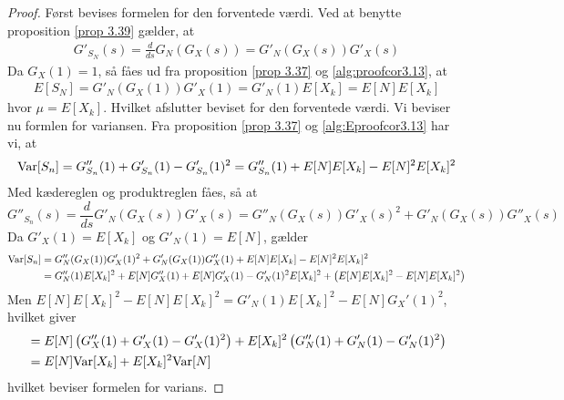 \begin{proof}
Først bevises formelen for den forventede værdi. Ved at benytte  proposition \ref{prop 3.39} gælder, at
\begin{align} \label{alg:proofcor3.13}
    G'_{S_N}(s) = \frac{d}{ds}G_N(G_X(s))=G'_N(G_X(s))G'_X(s)
\end{align}
Da $G_X(1)=1$, så fåes ud fra proposition \ref{prop 3.37} og \eqref{alg:proofcor3.13}, at
\begin{align} \label{alg:Eproofcor3.13}
    E[S_N]= G'_N(G_X(1))G'_X(1)=G'_N(1)E[X_k]=E[N]E[X_k]
\end{align}
hvor $\mu=E[X_k]$. Hvilket afslutter beviset for den forventede værdi. Vi beviser nu formlen for variansen. Fra proposition \ref{prop 3.37} og \eqref{alg:Eproofcor3.13} har vi, at 
\begin{equation*}
    \textnormal{Var}[S_n] = G''_{S_n}(1) + G'_{S_n}(1) - G'_{S_n}(1)^2 = G''_{S_n}(1) + E[N]E[X_k] - E[N]^2E[X_k]^2
\end{equation*}
Med kædereglen og produktreglen fåes, så at
\begin{equation*}
    G''_{S_n}(s) = \frac{d}{ds} G'_N(G_X(s))G'_X(s) = G''_N(G_X(s))G'_X(s)^2 + G'_N(G_X(s))G''_X(s)
\end{equation*}
Da $G'_X(1)=E[X_k]$ og $G'_N(1)=E[N]$, gælder
\begin{align*}
    \textnormal{Var}[S_n]&= 
     G''_N(G_X(1))G'_X(1)^2 + G'_N(G_X(1))G''_X(1)
    + E[N]E[X_k] - E[N]^2E[X_k]^2
    \\
    &= G''_N(1)E[X_k]^2 + E[N] G''_X(1) + E[N]G'_X(1) - G'_N(1)^2E[X_k]^2 + \left(E[N]E[X_k]^2 - E[N]E[X_k]^2\right)
\end{align*}
Men $E[N]E[X_k]^2 - E[N]E[X_k]^2 = G'_N(1)E[X_k]^2 - E[N]G_X'(1)^2$, hvilket giver
\begin{align*}
    &= E[N]\left(G''_X(1) + G'_X(1) - G'_X(1)^2 \right) + E[X_k]^2\left(G''_N(1) + G'_N(1) - G'_N(1)^2\right)
    \\
    &= E[N]\textnormal{Var}[X_k] + E[X_k]^2\textnormal{Var}[N]
\end{align*}
hvilket beviser formelen for varians.
\end{proof}


